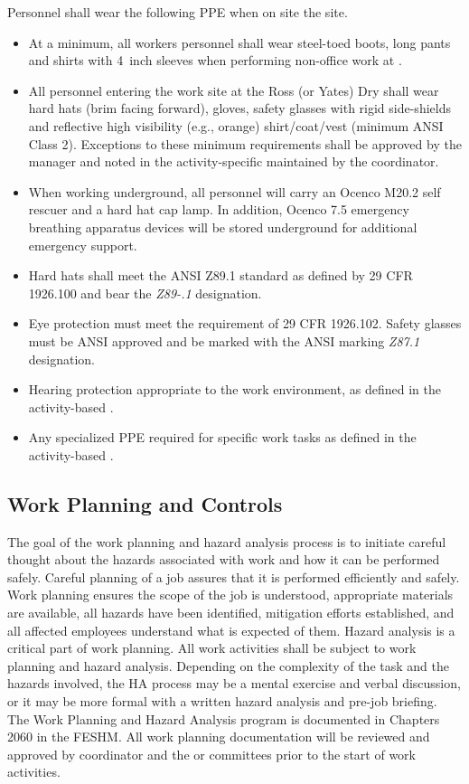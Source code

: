 Personnel shall wear the following PPE when on site the  site.
\begin{itemize}
\item At a minimum, all workers personnel shall wear
  steel-toed boots, long pants and shirts with 4~inch sleeves when
  performing non-office work at . 
  \item All personnel entering the work site at the Ross (or Yates) Dry
    shall wear hard hats (brim facing forward), gloves,
    safety glasses with rigid side-shields and reflective high
    visibility (e.g., orange) shirt/coat/vest (minimum ANSI Class 2).
    Exceptions to these minimum requirements shall be approved by the
      manager and noted in the
    activity-specific  maintained by the   coordinator.
  \item When working underground, all personnel will carry an Ocenco M20.2 self rescuer
    and a hard hat cap lamp. In addition, Ocenco 7.5 emergency breathing apparatus devices
    will be stored underground for additional emergency support.
  \item Hard hats shall meet the ANSI Z89.1 standard as defined by 29
    CFR 1926.100 and bear the {\em Z89-.1} designation.
   \item Eye protection must meet the requirement of 29 CFR
      1926.102. Safety glasses must be ANSI approved and be marked
      with the ANSI marking {\em Z87.1} designation.
    \item Hearing protection appropriate to the work environment, as
      defined in the activity-based .
    \item Any specialized PPE required for specific work tasks as
      defined in the activity-based . 
\end{itemize}

\subsection{Work Planning and Controls}

The goal of the work planning and hazard analysis process is to
initiate careful thought about the hazards associated with work and
how it can be performed safely. Careful planning of a job assures that
it is performed efficiently and safely. Work planning ensures the
scope of the job is understood, appropriate materials are available,
all hazards have been identified, mitigation efforts established, and
all affected employees understand what is expected of them. Hazard
analysis is a critical part of work planning. All work activities
shall be subject to work planning and hazard analysis. Depending on
the complexity of the task and the hazards involved, the HA process
may be a mental exercise and verbal discussion, or it may be more
formal with a written hazard analysis and pre-job briefing. The Work
Planning and Hazard Analysis program is documented in Chapters 2060 in
the FESHM. All work planning documentation will be reviewed and
approved by   coordinator and the 
 or  committees prior to the start of work activities.

